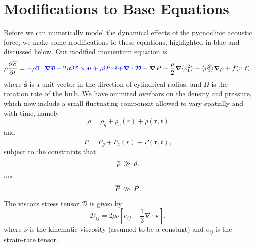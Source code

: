 
\section{Modifications to Base Equations}
Before we can numerically model the dynamical effects of the pycnoclinic acoustic force, we make some modifications to these equations, highlighted in blue and discussed below.  Our modified momentum equation is
\begin{equation}
    \rho\frac{ \partial \vvecbar }{\partial t}   =  {\color{blue} - \rho\vvecbar\cdot\boldsymbol{\nabla}\vvecbar}
    {\color{blue} \,-\, 2\rho\Omega\boldsymbol{\hat{z}}\times\vvec  + \rho\Omega^2r\boldsymbol{\hat{s}}}
    {\color{blue} + \boldsymbol{\nabla}\cdot\boldsymbol{\mathcal{D}}}
    -\boldsymbol{\nabla}P  %
						            - \frac{\rho}{2}\boldsymbol{\nabla}\langle v_1^2\rangle
							    - \langle v_1^2\rangle\boldsymbol{\nabla}\rho
							    + f(r,t),
\end{equation}
where $\boldsymbol{\hat{s}}$ is a unit vector in the direction of cylindrical radius, and $\Omega$ is the rotation rate of the bulb. We have ommited overbars on the density and pressure, which now include a small fluctuating component allowed to vary spatially and with time, namely
\begin{equation}
\rho = \rho_g+\rho_c(r)+\tilde{\rho}(\boldsymbol{r},t)
\end{equation}
and
\begin{equation}
P = P_g+P_c(r)+\tilde{P}(\boldsymbol{r},t),
\end{equation}
subject to the constraints that
\begin{equation}
\overline{\rho} \,\gg\, \tilde{\rho},
\end{equation}
and
\begin{equation}
\overline{P} \,\gg\, \tilde{P}.
\end{equation}

The viscous stress tensor $\boldsymbol{\mathcal{D}}$ is given by
\begin{equation}
\mathcal{D}_{ij} = 2\rho\nu\left[e_{ij}-\frac{1}{3}\boldsymbol{\nabla}\cdot\boldsymbol{v}\right],
\end{equation}
where $\nu$ is the kinematic viscosity (assumed to be a constant) and $e_{ij}$ is the strain-rate tensor.  

